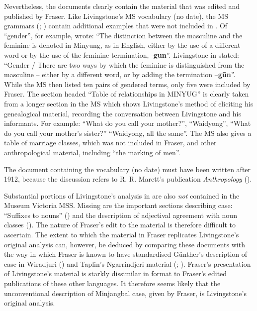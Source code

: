 Nevertheless, the documents clearly contain the material that was edited and published by Fraser. Like Livingstone’s MS vocabulary (no date), the MS grammars (\citeyear{livingstone_notitle_1876}; \citeyear{livingstone_notitle_1876-1}) contain additional examples that were not included in \citet{fraser_australian_1892}. Of ``gender'', for example, \citet{livingstone_notitle_1876} wrote: “The distinction between the masculine and the feminine is denoted in Minyung, as in English, either by the use of a different word or by the use of the feminine termination, -\textbf{gun}”. Livingstone in \citet[6]{fraser_australian_1892} stated: “Gender / There are two ways by which the feminine is distinguished from the masculine – either by a different word, or by adding the termination –\textbf{gūn}”. While the MS then listed ten pairs of gendered terms, only five were included by Fraser. The section headed “Table of relationships in MINYUG” \citep[21]{livingstone_grammar_1892} is clearly taken from a longer section in the MS \citeyearpar{livingstone_notitle_1876-1} which shows Livingstone’s method of eliciting his genealogical material, recording the conversation between Livingstone and his informants. For example: “What do you call your mother?”, “Waidyong”, “What do you call your mother’s sister?” “Waidyong, all the same”. The MS also gives a table of marriage classes, which was not included in Fraser, and other anthropological material, including “the marking of men”.

The document containing the vocabulary (no date) must have been written after 1912, because the discussion refers to R. R. Marett’s publication \textit{Anthropology} (\citeyear{marett_anthropology_1912}).

Substantial portions of Livingstone’s analysis in \citet{livingstone_grammar_1892} are also \textit{not} contained in the Museum Victoria MSS. Missing are the important sections describing case: “Suffixes to nouns” (\citeyear[9--11]{livingstone_grammar_1892}) and the description of adjectival agreement with noun classes (\citeyear[4--5]{livingstone_grammar_1892}). The nature of Fraser’s edit to the material is therefore difficult to ascertain. The extent to which the material in Fraser replicates Livingstone’s original analysis can, however, be deduced by comparing these documents with the way in which Fraser is known to have standardised Günther’s description of case in Wiradjuri () and Taplin’s Ngarrindjeri material (; ). Fraser’s presentation of Livingstone’s material is starkly dissimilar in format to Fraser’s edited publications of these other languages. It therefore seems likely that the unconventional description of Minjangbal case, given by Fraser, is Livingstone’s original analysis.

